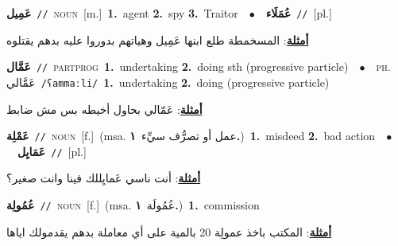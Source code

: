 \documentclass[10pt,a4paper,twoside]{article} %
\begin{document}
\begin{multicols}{2}
{\setlength\topsep{0pt}\textbf{\foreignlanguage{arabic}{عَمِيل}}\ {\color{gray}\texttt{//}\color{black}}\ \textsc{noun}\ [m.]\ \textbf{1.}~agent  \textbf{2.}~spy  \textbf{3.}~Traitor\ \ $\bullet$\ \ \setlength\topsep{0pt}\textbf{\foreignlanguage{arabic}{عُمَلَاء}}\ {\color{gray}\texttt{//}\color{black}}\ [pl.]\  \begin{flushright}\color{gray}\foreignlanguage{arabic}{\textbf{\underline{\foreignlanguage{arabic}{أمثلة}}}: المسخمطة طلع ابنها عَمِيل وهياتهم بدوروا عليه بدهم يقتلوه}\end{flushright}\color{black}} \vspace{2mm}

{\setlength\topsep{0pt}\textbf{\foreignlanguage{arabic}{عَمَّال}}\ {\color{gray}\texttt{//}\color{black}}\ \textsc{part\textunderscore prog}\ \textbf{1.}~undertaking  \textbf{2.}~doing sth (progressive particle)\ \ $\bullet$\ \ \textsc{ph.} \color{gray} \foreignlanguage{arabic}{عَمَّالي}\color{black}\ {\color{gray}\texttt{/{\sffamily ʕammaːli}/}\color{black}}\ \textbf{1.}~undertaking  \textbf{2.}~doing (progressive particle)\  \begin{flushright}\color{gray}\foreignlanguage{arabic}{\textbf{\underline{\foreignlanguage{arabic}{أمثلة}}}: عَمّالي بحاول أخيطه بس مش ضابط}\end{flushright}\color{black}} \vspace{2mm}

{\setlength\topsep{0pt}\textbf{\foreignlanguage{arabic}{عَمْلِة}}\ {\color{gray}\texttt{//}\color{black}}\ \textsc{noun}\ [f.]\ \color{gray}(msa. \foreignlanguage{arabic}{عمل أو تصرُّف سيِّء}~\foreignlanguage{arabic}{\textbf{١.}})\color{black}\ \textbf{1.}~misdeed  \textbf{2.}~bad action\ \ $\bullet$\ \ \setlength\topsep{0pt}\textbf{\foreignlanguage{arabic}{عَمَايِل}}\ {\color{gray}\texttt{//}\color{black}}\ [pl.]\  \begin{flushright}\color{gray}\foreignlanguage{arabic}{\textbf{\underline{\foreignlanguage{arabic}{أمثلة}}}: أنت ناسي عَمايِللك فينا وانت صغير؟}\end{flushright}\color{black}} \vspace{2mm}

{\setlength\topsep{0pt}\textbf{\foreignlanguage{arabic}{عُمُولِة}}\ {\color{gray}\texttt{//}\color{black}}\ \textsc{noun}\ [f.]\ \color{gray}(msa. \foreignlanguage{arabic}{عُمُولَة}~\foreignlanguage{arabic}{\textbf{١.}})\color{black}\ \textbf{1.}~commission\  \begin{flushright}\color{gray}\foreignlanguage{arabic}{\textbf{\underline{\foreignlanguage{arabic}{أمثلة}}}: المكتب باخذ عمولِة 20 بالمية على أي معاملة بدهم يقدمولك اياها}\end{flushright}\color{black}} \vspace{2mm}


\end{multicols}
\end{document}
